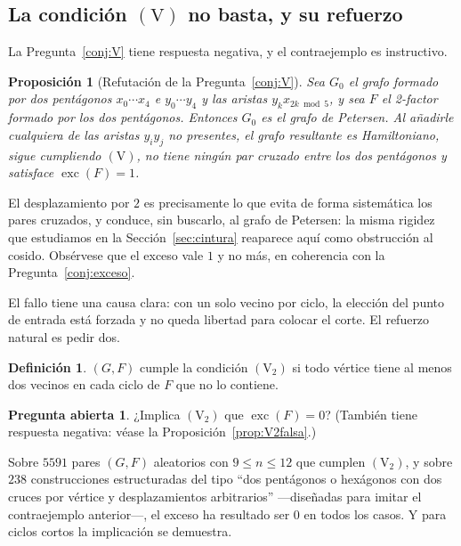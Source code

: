 \documentclass[11pt,a4paper]{article}
\newtheorem{proposicion}[teorema]{Proposición}
\theoremstyle{definition}
\newtheorem{definicion}[teorema]{Definición}
\newtheorem{pregunta}[teorema]{Pregunta abierta}
\theoremstyle{remark}
\begin{document}
\subsection{La condición $(\mathrm{V})$ no basta, y su refuerzo}\label{sub:V2}

La Pregunta~\ref{conj:V} tiene respuesta negativa, y el contraejemplo es instructivo.

\begin{proposicion}[Refutación de la Pregunta~\ref{conj:V}]\label{prop:Vfalsa}
Sea $G_0$ el grafo formado por dos pentágonos $x_0\cdots x_4$ e $y_0\cdots y_4$ y las aristas $y_kx_{2k\bmod 5}$, y sea $F$ el 2-factor formado por los dos pentágonos. Entonces $G_0$ es el grafo de Petersen. Al añadirle cualquiera de las aristas $y_iy_j$ no presentes, el grafo resultante es Hamiltoniano, sigue cumpliendo $(\mathrm{V})$, no tiene ningún par cruzado entre los dos pentágonos y satisface $\operatorname{exc}(F)=1$.
\end{proposicion}

El desplazamiento por $2$ es precisamente lo que evita de forma sistemática los pares cruzados, y conduce, sin buscarlo, al grafo de Petersen: la misma rigidez que estudiamos en la Sección~\ref{sec:cintura} reaparece aquí como obstrucción al cosido. Obsérvese que el exceso vale $1$ y no más, en coherencia con la Pregunta~\ref{conj:exceso}.

El fallo tiene una causa clara: con un solo vecino por ciclo, la elección del punto de entrada está forzada y no queda libertad para colocar el corte. El refuerzo natural es pedir dos.

\begin{definicion}
$(G,F)$ cumple la condición $(\mathrm{V}_2)$ si todo vértice tiene al menos dos vecinos en cada ciclo de $F$ que no lo contiene.
\end{definicion}

\begin{pregunta}\label{conj:V2}
¿Implica $(\mathrm{V}_2)$ que $\operatorname{exc}(F)=0$? (También tiene respuesta negativa: véase la Proposición~\ref{prop:V2falsa}.)
\end{pregunta}

Sobre $5591$ pares $(G,F)$ aleatorios con $9\le n\le12$ que cumplen $(\mathrm{V}_2)$, y sobre $238$ construcciones estructuradas del tipo ``dos pentágonos o hexágonos con dos cruces por vértice y desplazamientos arbitrarios'' —diseñadas para imitar el contraejemplo anterior—, el exceso ha resultado ser $0$ en todos los casos. Y para ciclos cortos la implicación se demuestra.
\end{document}
